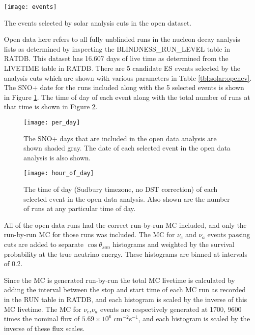 \begin{table}
\centering
\texttt{[image: events]}
\caption{The events selected by solar analysis cuts in the open dataset.}
\label{tbl:solar:openev}
\end{table}

Open data here refers to all fully unblinded runs in the nucleon decay analysis
lists as determined by inspecting the BLINDNESS\_RUN\_LEVEL table in RATDB.
This dataset has 16.607 days of live time as determined from the LIVETIME table
in RATDB.
There are 5 candidate ES events selected by the analysis cuts which are shown
with various parameters in Table \ref{tbl:solar:openev}.
The SNO+ date for the runs included along with the 5 selected events is shown
in Figure \ref{fig:solar:opendata}.
The time of day of each event along with the total number of runs at that time
is shown in Figure \ref{fig:solar:tod}.

\begin{figure}
\centering
\texttt{[image: per\_day]}
\caption{The SNO+ days that are included in the open data analysis are shown
         shaded gray.
         The date of each selected event in the open data analysis is also shown.}
\label{fig:solar:opendata}
\end{figure}


\begin{figure}
\centering
\texttt{[image: hour\_of\_day]}
\caption{The time of day (Sudbury timezone, no DST correction) of each selected
         event in the open data analysis.
         Also shown are the number of runs at any particular time of day.}
\label{fig:solar:tod}
\end{figure}

All of the open data runs had the correct run-by-run MC included, and only the 
run-by-run MC for those runs was included.
The MC for $\nu_e$ and $\nu_a$ events passing cuts are added to separate
$\cos{\theta_{sun}}$ histograms and weighted by the survival probability at the
true neutrino energy.
These histograms are binned at intervals of $0.2$.

Since the MC is generated run-by-run the total MC livetime is calculated by
adding the interval between the stop and start time of each MC run as recorded
in the RUN table in RATDB, and each histogram is scaled by the inverse of this
MC livetime.
The MC for $\nu_e$,$\nu_a$ events are respectively generated at 1700, 9600 times
the nominal flux of $5.69\times10^{6}$ cm$^{-2}$s$^{-1}$, and each histogram is
scaled by the inverse of these flux scales.

